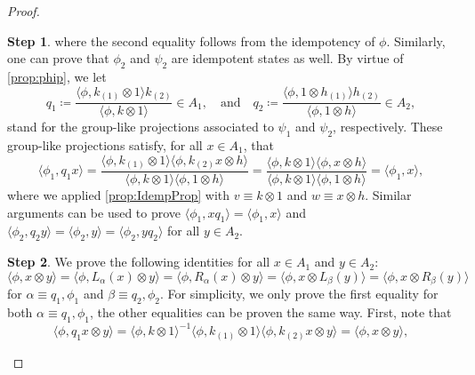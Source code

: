 \documentclass[a4paper,10pt]{amsart}
\newcommand{\eval}[2]{\langle #1 , #2\rangle}
\theoremstyle{definition}
\newtheorem{step-goursat}{Step}
\begin{document}
\begin{proof}
\begin{step-goursat}
where the second equality follows from the idempotency of $\phi$. Similarly, one can prove that \(\phi_2\) and \(\psi_2\) are idempotent states as well. 
By virtue of \cref{prop:phip}, we let
\begin{equation}
    q_1
    \coloneqq
        \frac{\eval{\phi}{k_{(1)}\otimes 1} k_{(2)}}{\eval{\phi}{k\otimes 1}} \in A_{1}
    ,\quad\text{and}\quad
    q_2
    \coloneqq
        \frac{\eval{\phi}{1\otimes h_{(1)}} h_{(2)}}{\eval{\phi}{1\otimes h}} \in A_{2},
\end{equation}
stand for the group-like projections associated to $\psi_1$ and $\psi_2$, respectively.
\smallbreak\noindent%
    These group-like projections satisfy,
    for all $x\in A_1$, that
    \begin{equation}\label{eq:phi_absorb_q}
        \eval{\phi_1}{q_1x}
        =
        \frac{\eval{\phi}{k_{(1)}\otimes 1}
        \eval{\phi}{k_{(2)} x\otimes h}}{\eval{\phi}{k\otimes 1}\eval{\phi}{1\otimes h}}
        =
        \frac{\eval{\phi}{k\otimes 1}\eval{\phi}{x\otimes h}}{\eval{\phi}{k\otimes 1}\eval{\phi}{1\otimes h}}
        =
        \eval{\phi_1}{x},
    \end{equation}
    where we applied \cref{prop:IdempProp} with $v\equiv k\otimes 1$ and $w\equiv x\otimes h$. Similar arguments can be used to prove $\eval{\phi_1}{xq_1}=\eval{\phi_1}{x}$ and $\eval{\phi_2}{q_2 y}=\eval{\phi_2}{y}=\eval{\phi_2}{y q_2}$ for all $y\in A_2$.
    \end{step-goursat}
    \begin{step-goursat}\label{prop:invariance_q_i_phi_i}
        We prove the following identities for all $x\in A_1$ and $y\in A_2$:
        \begin{equation*}
        \eval{\phi}{x \otimes y}
        =
        \eval{\phi}{L_{\alpha}(x) \otimes y}
        =
        \eval{\phi}{R_{\alpha}(x) \otimes y}
        =
        \eval{\phi}{x \otimes L_{\beta}(y)}
        =
        \eval{\phi}{x \otimes R_{\beta}(y)}
        \end{equation*}
        for $\alpha \equiv q_1,\phi_1$ and $\beta \equiv q_2, \phi_2$.
        For simplicity, we only prove the first equality for both $\alpha\equiv q_1,\phi_1$, the other equalities can be proven the same way.
        First, note that
        \begin{equation*}
            \eval{\phi}{q_1 x\otimes y}= \eval{\phi}{k\otimes 1}^{-1} \eval{\phi}{k_{(1)} \otimes 1} \eval{\phi}{k_{(2)} x\otimes y} =\eval{\phi}{x \otimes y},
        \end{equation*}

\end{step-goursat}
\end{proof}
\end{document}
